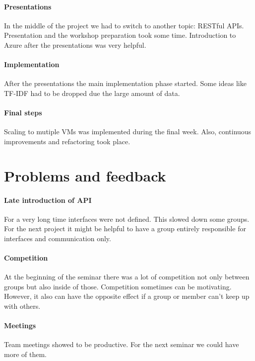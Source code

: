 \documentclass[DIV=calc, paper=a4, fontsize=11pt, twocolumn]{scrartcl}
\begin{document}
\paragraph{Presentations}
In the middle of the project we had to switch to another topic: RESTful APIs.
Presentation and the workshop preparation took some time. 
Introduction to Azure after the presentations was very helpful.

\paragraph{Implementation}
After the presentations the main implementation phase started.
Some ideas like TF-IDF had to be dropped due the large amount of data.

\paragraph{Final steps}
Scaling to mutiple VMs was implemented during the final week. Also, continuous improvements and refactoring took place.


\section*{Problems and feedback}
\paragraph{Late introduction of API} 
For a very long time interfaces were not defined. 
This slowed down some groups. 
For the next project it might be helpful to have a group entirely responsible for interfaces and communication only.

\paragraph{Competition} 
At the beginning of the seminar there was a lot of competition not only between groups but also inside of those. 
Competition sometimes can be motivating. 
However, it also can have the opposite effect if a group or member can't keep up with others.

\paragraph{Meetings}
Team meetings showed to be productive. 
For the next seminar we could have more of them.
\end{document}
